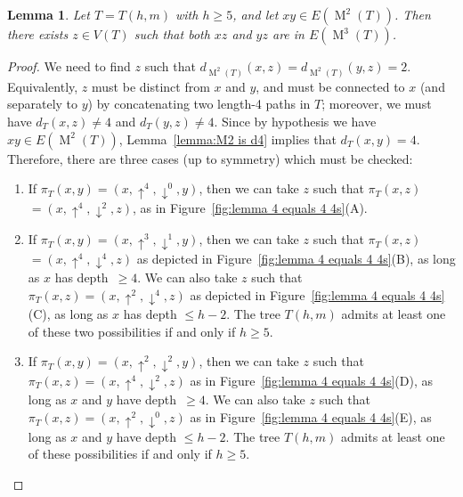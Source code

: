 \documentclass[12pt]{amsart}
\newtheorem{lemma}[theorem]{Lemma}
\theoremstyle{definition}
\theoremstyle{remark}
\numberwithin{equation}{section}
\numberwithin{figure}{section}
\newcommand{\M}{\operatorname{M}}
\begin{document}
   

\begin{lemma}
    \label{lemma:4 equals 4 4s}
    Let $T = T(h,m)$ with $h \geq 5$, and let $xy \in E(\M^2(T))$.
    Then there exists $z \in V(T)$ such that both $xz$ and $yz$ are in $E(\M^3(T))$.
\end{lemma}

\begin{proof}
    We need to find $z$ such that $d_{\M^2(T)}(x,z) = d_{\M^2(T)}(y,z) = 2$.
    Equivalently, $z$ must be distinct from $x$ and $y$, and must be connected to $x$ (and separately to $y$) by concatenating two length-4 paths in $T$; moreover, we must have $d_T(x,z) \neq 4$ and $d_T(y,z) \neq 4$.
    Since by hypothesis we have $xy \in E(\M^2(T))$, Lemma~\ref{lemma:M2 is d4} implies that $d_T(x,y)=4$.
    Therefore, there are three cases (up to symmetry) which must be checked:
    \begin{enumerate}
    \setlength{\itemsep}{1ex}
        \item If $\pi_T(x,y) = (x,\uparrow^4,\downarrow^0,y)$, then we can take $z$ such that $\pi_T(x,z)$ $ = (x,\uparrow^4,\downarrow^2,z)$, as in Figure~\ref{fig:lemma 4 equals 4 4s}(A).
        \item If $\pi_T(x,y) = (x, \uparrow^3, \downarrow^1,y)$, then we can take $z$ such that $\pi_T(x,z)$ $ = (x,\uparrow^4, \downarrow^4, z)$ as depicted in Figure~\ref{fig:lemma 4 equals 4 4s}(B), as long as $x$ has depth~${\geq 4}$.
        We can also take $z$ such that $\pi_T(x,z) = (x, \uparrow^2, \downarrow^4, z)$ as depicted in Figure~\ref{fig:lemma 4 equals 4 4s}(C), as long as $x$ has depth $\leq h-2$. 
        The tree $T(h,m)$ admits at least one of these two possibilities if and only if $h \geq 5$.

        \item If $\pi_T(x,y) = (x, \uparrow^2, \downarrow^2, y)$, then we can take $z$ such that $\pi_T(x,z) = (x, \uparrow^4, \downarrow^2, z)$ as in Figure~\ref{fig:lemma 4 equals 4 4s}(D), as long as $x$ and $y$ have depth~${\geq 4}$.
        We can also take $z$ such that $\pi_T(x,z) = (x, \uparrow^2, \downarrow^0, z)$ as in Figure~\ref{fig:lemma 4 equals 4 4s}(E), as long as $x$ and $y$ have depth $\leq h-2$.
        The tree $T(h,m)$ admits at least one of these possibilities if and only if $h \geq 5$. \qedhere
        \end{enumerate}
\end{proof}
\end{document}
